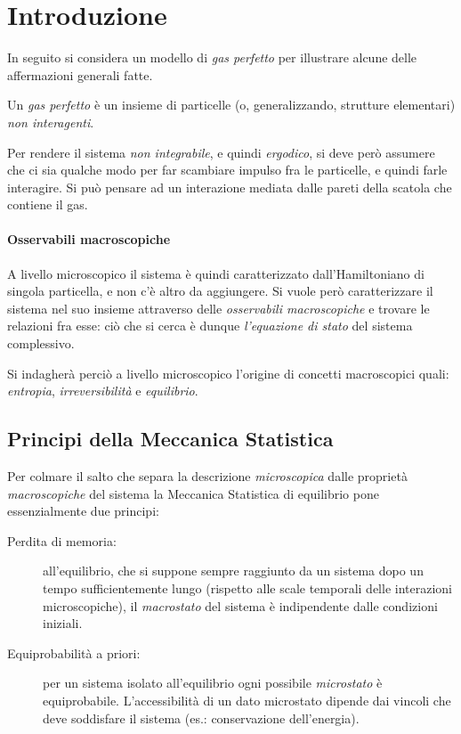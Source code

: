 
\section{Introduzione}

In seguito si considera un modello di \textit{gas perfetto} per illustrare alcune delle affermazioni generali fatte.

\begin{defn}
	\label{def:perfgas}
	Un \textit{gas perfetto} è un insieme di particelle (o, generalizzando, strutture elementari) \textit{non interagenti}.
\end{defn}

Per rendere il sistema \textit{non integrabile}, e quindi \textit{ergodico}, si deve però assumere che ci sia qualche modo per far scambiare impulso fra le particelle, e quindi farle interagire. Si può pensare ad un interazione mediata dalle pareti della scatola che contiene il gas.

\paragraph{Osservabili macroscopiche} A livello microscopico il sistema è quindi caratterizzato dall'Hamiltoniano di singola particella, e non c'è altro da aggiungere. Si vuole però caratterizzare il sistema nel suo insieme attraverso delle \textit{osservabili macroscopiche} e trovare le relazioni fra esse: ciò che si cerca è dunque \textit{l'equazione di stato} del sistema complessivo.

Si indagherà perciò a livello microscopico l'origine di concetti macroscopici quali: \textit{entropia}, \textit{irreversibilità} e \textit{equilibrio}.

\subsection{Principi della Meccanica Statistica}
\label{sec:principles}
Per colmare il salto che separa la descrizione \textit{microscopica} dalle proprietà \textit{macroscopiche} del sistema la Meccanica Statistica di equilibrio pone essenzialmente due principi:

\begin{description}
	\item[Perdita di memoria:] all'equilibrio, che si suppone sempre raggiunto da un sistema dopo un tempo sufficientemente lungo (rispetto alle scale temporali delle interazioni microscopiche), il \textit{macrostato} del sistema è indipendente dalle condizioni iniziali.
	\item[Equiprobabilità a priori:] per un sistema isolato all'equilibrio ogni possibile \textit{microstato} è equiprobabile. L'accessibilità di un dato microstato dipende dai vincoli che deve soddisfare il sistema (es.: conservazione dell'energia).
\end{description}

